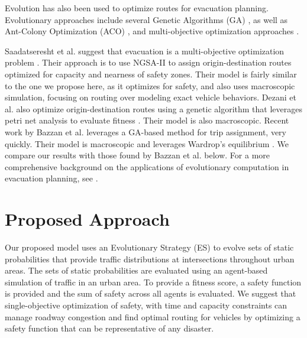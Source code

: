 \documentclass{sig-alternate-05-2015}
\begin{document}
	Evolution has also been used to optimize routes for evacuation planning. Evolutionary approaches include several Genetic Algorithms (GA) \cite{dezani2014optimizing}, as well as Ant-Colony Optimization (ACO) \cite{forcael2014ant}, \cite{zong2010multi} and multi-objective optimization approaches \cite{saadatseresht2009evacuation}.
	
	Saadatseresht et al. suggest that evacuation is a multi-objective optimization problem \cite{saadatseresht2009evacuation}. Their approach is to use NGSA-II \cite{deb2002fast} to assign origin-destination routes optimized for capacity and nearness of safety zones. Their model is fairly similar to the one we propose here, as it optimizes for safety, and also uses macroscopic simulation, focusing on routing over modeling exact vehicle behaviors. 
	Dezani et al. also optimize origin-destination routes using a genetic algorithm that leverages petri net analysis to evaluate fitness \cite{dezani2014optimizing}. Their model is also macroscopic.
	Recent work by Bazzan et al. \cite{bazzan2014evolutionary} leverages a GA-based method for trip assignment, very quickly. Their model is macroscopic and leverages Wardrop's equilibrium \cite{wardrop1952road}. We compare our results with those found by Bazzan et al. below. 
	For a more comprehensive background on the applications of evolutionary computation in evacuation planning, see \cite{muhdi2006application}.
	
%	
	
	\section{Proposed Approach}
	Our proposed model uses an Evolutionary Strategy (ES) to evolve sets of static probabilities that provide traffic distributions at intersections throughout urban areas. The sets of static probabilities are evaluated using an agent-based simulation of traffic in an urban area. To provide a fitness score, a safety function is provided and the sum of safety across all agents is evaluated. We suggest that single-objective optimization of safety, with time and capacity constraints can manage roadway congestion and find optimal routing for vehicles by optimizing a safety function that can be representative of any disaster. 
	
\end{document}
